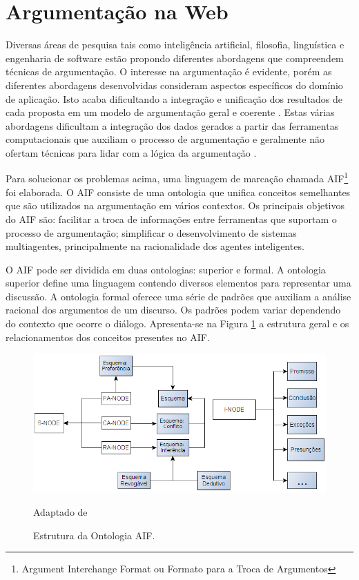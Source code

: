 \section{Argumentação na Web}

Diversas áreas de pesquisa tais como inteligência artificial, filosofia, linguística e engenharia de software estão propondo diferentes abordagens que compreendem técnicas de argumentação. O interesse na argumentação é evidente, porém as diferentes abordagens desenvolvidas consideram aspectos específicos do domínio de aplicação. Isto acaba dificultando a integração e unificação dos resultados de cada proposta em um modelo de argumentação geral e coerente \cite{bex_formal_2010}. Estas várias abordagens dificultam a integração dos dados gerados a partir das  ferramentas computacionais que auxiliam o processo de argumentação e geralmente não ofertam técnicas para lidar com a lógica da argumentação \cite{rahwan2011}.  

Para solucionar os problemas acima, uma linguagem de marcação chamada AIF\footnote{Argument Interchange Format ou Formato para a Troca de Argumentos} \cite{rahwan2011} foi elaborada. O AIF consiste de uma ontologia que unifica conceitos semelhantes que são utilizados na argumentação em vários contextos. Os principais objetivos do AIF são: facilitar a troca de informações entre ferramentas que suportam o processo de argumentação; simplificar o desenvolvimento de sistemas multiagentes, principalmente na racionalidade dos agentes inteligentes. 
	
O AIF pode ser dividida em duas ontologias:  superior e formal. A ontologia superior define uma linguagem contendo diversos elementos para representar uma discussão. A ontologia formal oferece uma série de padrões que auxiliam a análise racional dos argumentos de um discurso.  Os padrões podem variar dependendo do contexto que ocorre o diálogo. Apresenta-se na Figura \ref{elementos-ontologia-aif} a estrutura geral e os relacionamentos dos conceitos presentes no AIF. 

\graphicspath{{figuras/}}
\begin{figure}[H]
\centering
\includegraphics[width=1\textwidth]{aif_ontologia_2}
\caption{Estrutura da Ontologia AIF.}{Adaptado de \cite{bex_formal_2010}} 
\label{elementos-ontologia-aif}
\end{figure}

